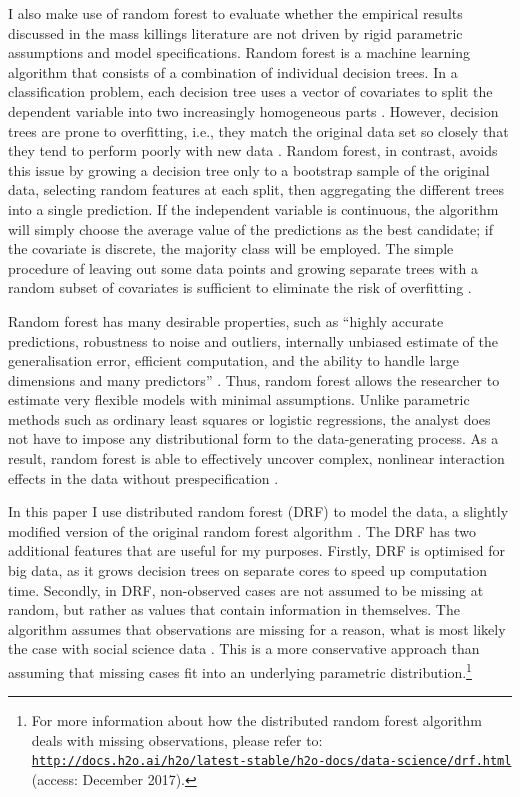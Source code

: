 \documentclass[a4paper,12pt]{article}
\begin{document}
I also make use of random forest \citep{breiman2001random} to evaluate whether the empirical results discussed in the mass killings literature are not driven by rigid parametric assumptions and model specifications. Random forest is a machine learning algorithm that consists of a combination of individual decision trees. In a classification problem, each decision tree uses a vector of covariates to split the dependent variable into two increasingly homogeneous parts \citep{breiman2001statistical}. However, decision trees are prone to overfitting, i.e., they match the original data set so closely that they tend to perform poorly with new data \citep{dietterich1995comparison,ho1998random}. Random forest, in contrast, avoids this issue by growing a decision tree only to a bootstrap sample of the original data, selecting random features at each split, then aggregating the different trees into a single prediction. If the independent variable is continuous, the algorithm will simply choose the average value of the predictions as the best candidate; if the covariate is discrete, the majority class will be employed. The simple procedure of leaving out some data points and growing separate trees with a random subset of covariates is sufficient to eliminate the risk of overfitting \citep[9-10]{jones2015exploratory}.
	
Random forest has many desirable properties, such as ``highly accurate predictions, robustness to noise and outliers, internally unbiased estimate of the generalisation error, efficient computation, and the ability to handle large dimensions and many predictors'' \citep[7]{muchlinski2015comparing}. Thus, random forest allows the researcher to estimate very flexible models with minimal assumptions. Unlike parametric methods such as ordinary least squares or logistic regressions, the analyst does not have to impose any distributional form to the data-generating process. As a result, random forest is able to effectively uncover complex, nonlinear interaction effects in the data without prespecification \citep{jones2015exploratory,jones2018there}.
	
In this paper I use distributed random forest (DRF) to model the data, a slightly modified version of the original random forest algorithm \citep{h2o2017}. The DRF has two additional features that are useful for my purposes. Firstly, DRF is optimised for big data, as it grows decision trees on separate cores to speed up computation time. Secondly, in DRF, non-observed cases are not assumed to be missing at random, but rather as values that contain information in themselves. The algorithm assumes that observations are missing for a reason, what is most likely the case with social science data \citep{lall2016multiple}. This is a more conservative approach than assuming that missing cases fit into an underlying parametric distribution.\footnote{For more information about how the distributed random forest algorithm deals with missing observations, please refer to: \href{http://docs.h2o.ai/h2o/latest-stable/h2o-docs/data-science/drf.html}{\texttt{http://docs.h2o.ai/h2o/latest-stable/h2o-docs/data-science/drf.html}} (access: December 2017).}
	
\end{document}
